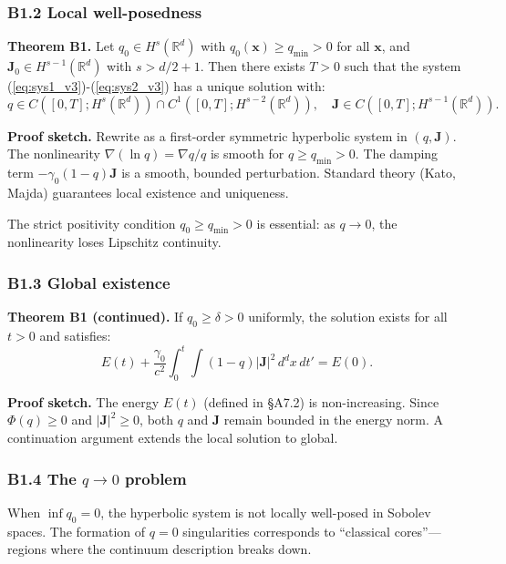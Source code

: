 \documentclass[reprint]{revtex4-2}
\begin{document}
\subsubsection{B1.2 Local well-posedness}

\textbf{Theorem B1.} Let $q_0 \in H^s(\mathbb{R}^d)$ with $q_0(\mathbf{x}) \ge q_{\min} > 0$ for all $\mathbf{x}$, and $\mathbf{J}_0 \in H^{s-1}(\mathbb{R}^d)$ with $s > d/2+1$. Then there exists $T>0$ such that the system (\ref{eq:sys1_v3})-(\ref{eq:sys2_v3}) has a unique solution with:
\begin{equation}
q \in C([0,T]; H^s(\mathbb{R}^d)) \cap C^1([0,T]; H^{s-2}(\mathbb{R}^d)), \quad \mathbf{J} \in C([0,T]; H^{s-1}(\mathbb{R}^d)).
\end{equation}

\textbf{Proof sketch.} Rewrite as a first-order symmetric hyperbolic system in $(q, \mathbf{J})$. The nonlinearity $\nabla(\ln q) = \nabla q/q$ is smooth for $q \ge q_{\min} > 0$. The damping term $-\gamma_0(1-q)\mathbf{J}$ is a smooth, bounded perturbation. Standard theory (Kato, Majda) guarantees local existence and uniqueness.

The strict positivity condition $q_0 \ge q_{\min} > 0$ is essential: as $q\to 0$, the nonlinearity loses Lipschitz continuity.

\subsubsection{B1.3 Global existence}

\textbf{Theorem B1 (continued).} If $q_0 \ge \delta > 0$ uniformly, the solution exists for all $t > 0$ and satisfies:
\begin{equation}
E(t) + \frac{\gamma_0}{c^2}\int_0^t \int (1-q)|\mathbf{J}|^2\,d^d x\,dt' = E(0).
\end{equation}

\textbf{Proof sketch.} The energy $E(t)$ (defined in \S A7.2) is non-increasing. Since $\Phi(q) \ge 0$ and $|\mathbf{J}|^2 \ge 0$, both $q$ and $\mathbf{J}$ remain bounded in the energy norm. A continuation argument extends the local solution to global.

\subsubsection{B1.4 The $q\to 0$ problem}

When $\inf q_0 = 0$, the hyperbolic system is not locally well-posed in Sobolev spaces. The formation of $q=0$ singularities corresponds to ``classical cores''---regions where the continuum description breaks down.
\end{document}
